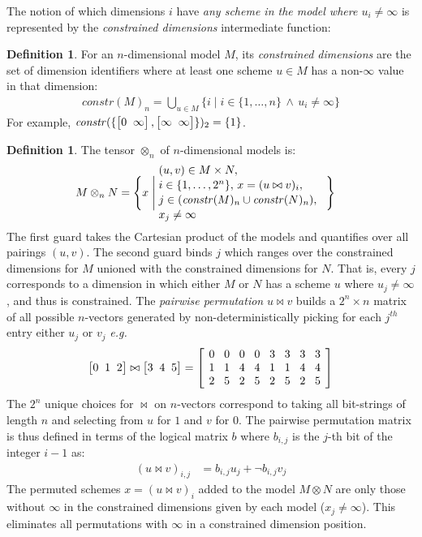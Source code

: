 \documentclass[10pt,preprint,numbers]{sigplanconf}
\newcounter{block}
\theoremstyle{definition}
\newtheorem{definition}[block]{Definition}
\newcommand{\eg}{\emph{e.g.}}
\newcommand{\vtwoh}[2]{\setlength{\arraycolsep}{0em}
\left[\begin{array}{cc}#1 \; & \; #2\end{array}\right]}
\newcommand{\vthreeh}[3]{\setlength{\arraycolsep}{0em}
\left[\begin{array}{ccc}#1 \; & \; #2 \; & \; #3\end{array}\right]}
\newcommand{\effdims}[2]{\mathit{constr}(#1)_{#2}}
\begin{document}
The notion of which dimensions $i$ have \emph{any scheme in the model
where $u_i \neq \infty$} is represented by the \emph{constrained
dimensions} intermediate function:
\begin{definition}%
For an $n$-dimensional model $M$, its \emph{constrained dimensions}
are the set of dimension identifiers where at least one scheme $u \in M$ has
a non-$\infty$ value in that dimension:
%
\begin{align*}
\effdims{M}{n} =
\bigcup_{u \in M} \{i \mid i \in \{1,\ldots,n\} \, \wedge \, u_i \neq
  \infty\}
\end{align*}
For example, $\effdims{\{\vtwoh{0}{\infty},\vtwoh{\infty}{\infty}\}}{2}
 = \{1\}$.
\end{definition}
\begin{definition}The tensor $\otimes_n$ of $n$-dimensional
models is:
\begin{alignat*}{2}
& M \otimes_n N =
  \Bigg\{x \; \Bigg| \;
    \parbox{5.2cm}{$(u, v) \in M \times N,$ \\[0.1em]
                  $\;\; i \in \{1, \ldots, 2^n\}, \,
                  x = (u \bowtie v)_i,$ \\[0.1em]
                  $\;\; j \in (\effdims{M}{n} \cup
                   \effdims{N}{n}),$\\[0.1em]
                   $\;\; x_j \neq \infty$
                  } \Bigg\}
\end{alignat*}
The first guard takes the Cartesian product of
the models and quantifies over all pairings $(u, v)$.
The second guard binds $j$ which ranges over the constrained
dimensions for $M$ unioned with the constrained dimensions for $N$.
That is, every $j$ corresponds to a dimension in which
either $M$ or $N$ has a scheme $u$ where $u_j \neq \infty$,
and thus is constrained.
The \emph{pairwise permutation} $u \bowtie v$
builds a $2^n \times n$ matrix
of all possible $n$-vectors generated by
non-deterministically picking for each $j^{th}$ entry either
$u_j$ or $v_j$ \eg{}
%
\begin{equation*}
\vthreeh{0}{1}{2} \bowtie \vthreeh{3}{4}{5} =
\left[
\setlength{\arraycolsep}{0.42em}
\begin{array}{cccccccc}
0 & 0 & 0 & 0 & 3 & 3 & 3 & 3 \\
1 & 1 & 4 & 4 & 1 & 1 & 4 & 4 \\
2 & 5 & 2 & 5 & 2 & 5 & 2 & 5
\end{array}
\right]
\end{equation*}
%
The $2^n$ unique choices for $\bowtie$ on $n$-vectors
correspond to taking all bit-strings of length $n$ and
selecting from $u$ for $1$ and $v$ for $0$. The pairwise permutation
matrix is thus defined in terms of the logical
matrix $b$ where $b_{i,j}$ is the $j$-th bit of the integer
$i - 1$ as:
%
\begin{align*}
(u \bowtie v)_{i,j} & = b_{i,j} u_j + \neg b_{i,j} v_j
\end{align*}
%
The permuted schemes $x = (u \bowtie v)_i$ added to the model
$M \otimes N$ are only those without $\infty$ in
the constrained dimensions given by each model ($x_j \neq
\infty$). This eliminates all permutations with
$\infty$ in a constrained dimension position.
\end{definition}
\end{document}

